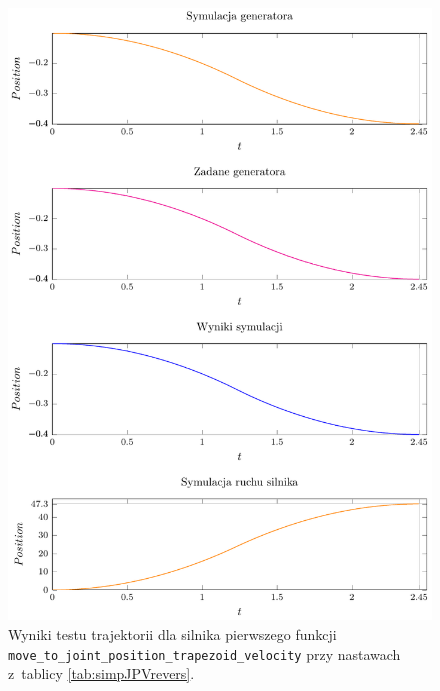 \documentclass[a4paper, 12pt]{article}
\begin{document}
	\begin{figure}[H]
		\centering
		\includegraphics[scale=1.2]{raport_graphs/simpJPVrevers.pdf}
		\caption{Wyniki testu trajektorii dla silnika pierwszego funkcji \texttt{move\_to\_joint\_position\_trapezoid\_velocity} przy nastawach z~tablicy \ref{tab:simpJPVrevers}.}
		\label{fig:simpJPVrevers}
	\end{figure}
		
\end{document}
